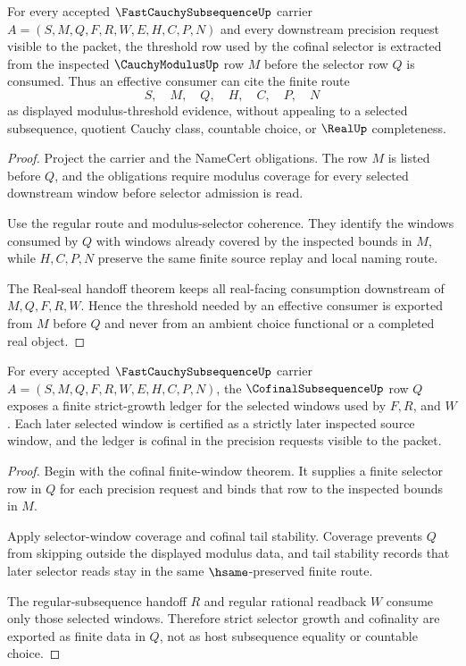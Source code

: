 \begin{theorem}
\label{thm:fast-cauchy-subsequence-modulus-threshold-extraction}
For every accepted $\FastCauchySubsequenceUp$ carrier $A=(S,M,Q,F,R,W,E,H,C,P,N)$ and every downstream precision request visible to the packet, the threshold row used by the cofinal selector is extracted from the inspected $\CauchyModulusUp$ row $M$ before the selector row $Q$ is consumed. Thus an effective consumer can cite the finite route
$$
S,\quad M,\quad Q,\quad H,\quad C,\quad P,\quad N
$$
as displayed modulus-threshold evidence, without appealing to a selected subsequence, quotient Cauchy class, countable choice, or $\RealUp$ completeness.
\end{theorem}
\begin{proof}
Project the carrier and the NameCert obligations. The row $M$ is listed before $Q$, and the obligations require modulus coverage for every selected downstream window before selector admission is read.

Use the regular route and modulus-selector coherence. They identify the windows consumed by $Q$ with windows already covered by the inspected bounds in $M$, while $H,C,P,N$ preserve the same finite source replay and local naming route.

The Real-seal handoff theorem keeps all real-facing consumption downstream of $M,Q,F,R,W$. Hence the threshold needed by an effective consumer is exported from $M$ before $Q$ and never from an ambient choice functional or a completed real object.
\end{proof}

\begin{theorem}
\label{thm:fast-cauchy-subsequence-cofinal-selector-strict-growth}
For every accepted $\FastCauchySubsequenceUp$ carrier $A=(S,M,Q,F,R,W,E,H,C,P,N)$, the $\CofinalSubsequenceUp$ row $Q$ exposes a finite strict-growth ledger for the selected windows used by $F,R$, and $W$. Each later selected window is certified as a strictly later inspected source window, and the ledger is cofinal in the precision requests visible to the packet.
\end{theorem}
\begin{proof}
Begin with the cofinal finite-window theorem. It supplies a finite selector row in $Q$ for each precision request and binds that row to the inspected bounds in $M$.

Apply selector-window coverage and cofinal tail stability. Coverage prevents $Q$ from skipping outside the displayed modulus data, and tail stability records that later selector reads stay in the same $\hsame$-preserved finite route.

The regular-subsequence handoff $R$ and regular rational readback $W$ consume only those selected windows. Therefore strict selector growth and cofinality are exported as finite data in $Q$, not as host subsequence equality or countable choice.
\end{proof}

